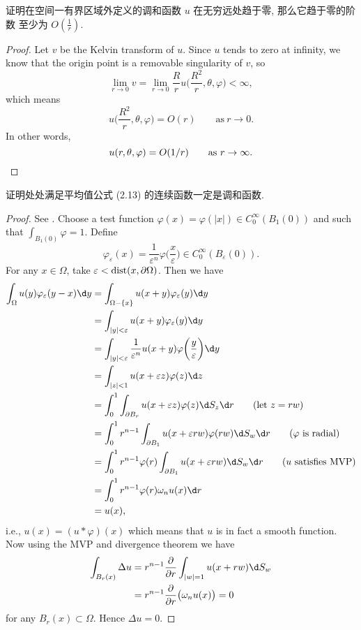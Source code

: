 \begin{exercise}
  证明在空间一有界区域外定义的调和函数 $u$ 在无穷远处趋于零, 那么它趋于零的阶数
  至少为 $O(\frac{1}{r})$.
\end{exercise}

\begin{proof}
  Let $v$ be the Kelvin transform of $u$.
  Since $u$ tends to zero at infinity, we know that the origin point is
  a removable singularity of $v$, so
  \[ \lim_{r\to 0} v = \lim_{r\to 0} \frac{R}{r} u\biggl(\frac{R^2}{r},\theta,\varphi\biggr) <\infty, \]
  which means
  \[ u\biggl(\frac{R^2}{r},\theta,\varphi\biggr) = O(r) \qquad \text{as}\ r\to 0. \]
  In other words,
  \[ u(r,\theta,\varphi) = O(1/r) \qquad \text{as}\ r\to\infty. \qedhere \]
\end{proof}

\begin{exercise}
  证明处处满足平均值公式 (2.13) 的连续函数一定是调和函数.
\end{exercise}

\begin{proof}
  See \cite[Theorem~1.8]{han_elliptic_2011}.
  Choose a test function $\varphi(x)=\varphi(|x|)\in C_0^\infty(B_1(0))$ and such that
  $\int_{B_1(0)} \varphi =1$. Define
  \[ \varphi_\varepsilon(x) = \frac{1}{\varepsilon^n} \varphi\biggl(\frac{x}{\varepsilon}\biggr)
      \in C_0^\infty(B_{\varepsilon}(0)). \]
  For any $x\in\Omega$, take $\varepsilon<\operatorname{dist}(x,\partial\Omega)$. Then we have
  \begin{align*}
    \int_\Omega u(y) \varphi_\varepsilon(y-x) \d y
    & = \int_{\Omega-\{x\}} u(x+y) \varphi_\varepsilon(y) \d y \\
    & = \int_{|y|<\varepsilon} u(x+y) \varphi_\varepsilon(y) \d y \\
    & = \int_{|y|<\varepsilon} \frac{1}{\varepsilon^n} u(x+y)
        \varphi\biggl(\frac{y}{\varepsilon}\biggr) \d y \\
    & = \int_{|z|<1} u(x+\varepsilon z) \varphi(z) \d z \\
    & = \int_0^1 \int_{\partial B_r} u(x+\varepsilon z) \varphi(z) \d S_z \d r \qquad (\text{let }z=rw)\\
    & = \int_0^1 r^{n-1} \int_{\partial B_1} u(x+\varepsilon rw) \varphi(rw) \d S_w \d r
        \qquad (\varphi\ \text{is radial}) \\
    & = \int_0^1 r^{n-1} \varphi(r) \int_{\partial B_1} u(x+\varepsilon rw) \d S_w \d r
        \qquad (u\ \text{satisfies MVP}) \\
    & = \int_0^1 r^{n-1} \varphi(r) \omega_n u(x) \d r \\
    & = u(x),
  \end{align*}
  i.e., $u(x) = (u*\varphi)(x)$ which means that $u$ is in fact a smooth function.
  Now using the MVP and divergence theorem we have
  \begin{align*}
    \int_{B_r(x)} \Delta u
    & = r^{n-1} \frac{\partial}{\partial r}\int_{|w|=1} u(x+rw) \d S_w \\
    & = r^{n-1} \frac{\partial}{\partial r}\bigl(\omega_n u(x)\bigr) = 0
  \end{align*}
  for any $B_r(x)\subset\Omega$. Hence $\Delta u = 0$.
\end{proof}


